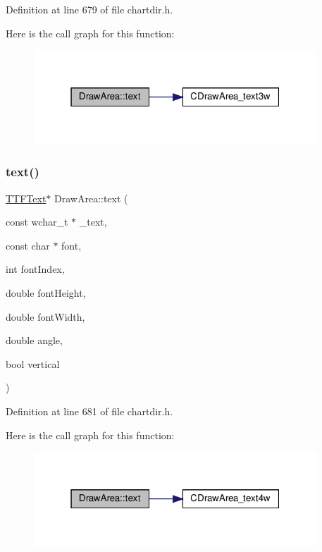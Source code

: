Definition at line 679 of file chartdir.\+h.

Here is the call graph for this function\+:
\nopagebreak
\begin{figure}[H]
\begin{center}
\leavevmode
\includegraphics[width=301pt]{class_draw_area_ac71c035d2b44bb229767ec3fb3c9b505_cgraph}
\end{center}
\end{figure}
\mbox{\label{class_draw_area_aaab26901803c8e2946efcf11f6b63839}} 
\subsubsection{\texorpdfstring{text()}{text()}\hspace{0.1cm}{\footnotesize\ttfamily [7/8]}}
{\footnotesize\ttfamily \hyperlink{class_t_t_f_text}{T\+T\+F\+Text}$\ast$ Draw\+Area\+::text (\begin{DoxyParamCaption}\item[{const wchar\+\_\+t $\ast$}]{\+\_\+text,  }\item[{const char $\ast$}]{font,  }\item[{int}]{font\+Index,  }\item[{double}]{font\+Height,  }\item[{double}]{font\+Width,  }\item[{double}]{angle,  }\item[{bool}]{vertical }\end{DoxyParamCaption})\hspace{0.3cm}{\ttfamily [inline]}}



Definition at line 681 of file chartdir.\+h.

Here is the call graph for this function\+:
\nopagebreak
\begin{figure}[H]
\begin{center}
\leavevmode
\includegraphics[width=301pt]{class_draw_area_aaab26901803c8e2946efcf11f6b63839_cgraph}
\end{center}
\end{figure}
\mbox{\label{class_draw_area_ad861166eb9e2280d51a0e68dd03f496b}} 
